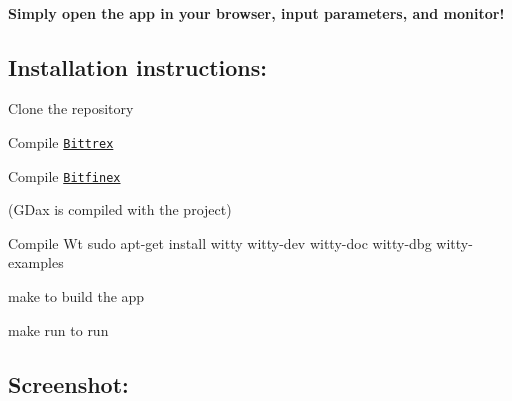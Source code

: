 \paragraph*{Simply open the app in your browser, input parameters, and monitor!}

\subsection*{Installation instructions\+:}


\begin{DoxyItemize}
\item Clone the repository
\item Compile \href{https://github.com/gurpinars/bittrex-cpp}{\tt Bittrex}
\item Compile \href{https://github.com/MMquant/bfx-cpp-api}{\tt Bitfinex}
\end{DoxyItemize}

(G\+Dax is compiled with the project)


\begin{DoxyItemize}
\item Compile Wt {\ttfamily sudo apt-\/get install witty witty-\/dev witty-\/doc witty-\/dbg witty-\/examples}
\item {\ttfamily make} to build the app
\item {\ttfamily make run} to run
\end{DoxyItemize}

\subsection*{Screenshot\+:}

 